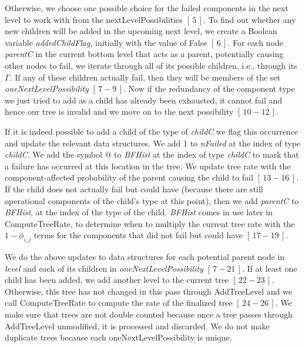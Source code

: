 \documentclass[12pt]{article}
\newcommand{\citeLine}[1]{$[\,#1\,]$}
\newcommand{\citeBlock}[2]{$[\,#1 - #2\,]$}
\begin{document}
 Otherwise, we choose one possible choice for the failed components in the next level to work with from the nextLevelPossibilities \citeLine{5}. To find out whether any new children will be added in the upcoming next level, we create a Boolean variable \textit{addedChildFlag}, initially with the value of False \citeLine{6}. For each node \textit{parentC} in the current bottom level that acts as a parent, potentially causing other nodes to fail, we iterate through all of its possible children, i.e., through its $\Gamma$. If any of these children actually fail, then they will be members of the set \textit{oneNextLevelPossibility} \citeBlock{7}{9}. Now if the redundancy of the component type we just tried to add as a child has already been exhausted, it cannot fail and hence our tree is invalid and we move on to the next possibility \citeBlock{10}{12}.

 If it is indeed possible to add a child of the type of \textit{childC} we flag this occurrence and update the relevant data structures. We add 1 to \textit{nFailed} at the index of type \textit{childC}. We add the symbol @ to \textit{BFHist} at the index of type \textit{childC} to mark that a failure has occurred at this location in the tree. We update tree rate with the component-affected probability of the parent causing the child to fail \citeBlock{13}{16}. If the child does not actually fail but could have (because there are still operational components of the child's type at this point), then we add \textit{parentC} to \textit{BFHist}, at the index of the type of the child. \textit{BFHist} comes in use later in ComputeTreeRate, to determine when to multiply the current tree rate with the $1-\phi_{i,j}$ terms for the components that did not fail but could have \citeBlock{17}{19}.

 We do the above updates to data structures for each potential parent node in \textit{level} and each of its children in \textit{oneNextLevelPossibility} \citeBlock{7}{21}. If at least one child has been added, we add another level to the current tree \citeBlock{22}{23}. Otherwise, this tree has not changed in this pass through AddTreeLevel and we call ComputeTreeRate to compute the rate of the finalized tree \citeBlock{24}{26}. We make sure that trees are not double counted because once a tree passes through AddTreeLevel unmodified, it is processed and discarded. We do not make duplicate trees because each oneNextLevelPossibility is unique.
\end{document}
